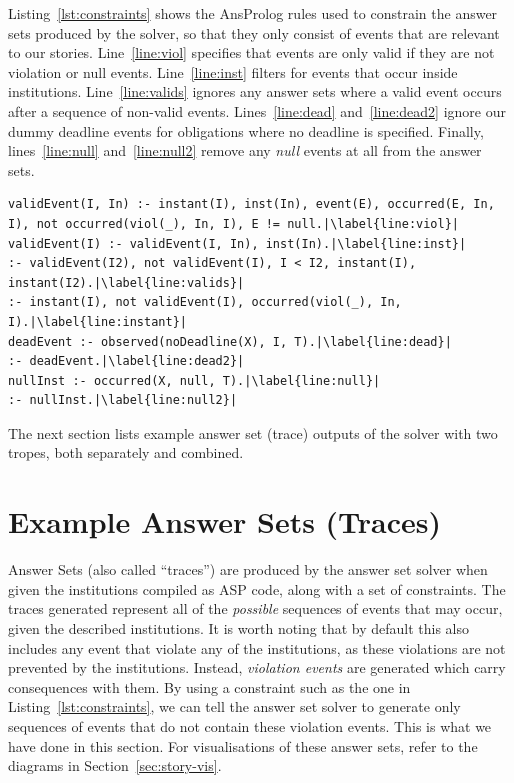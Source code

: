 \documentclass[11pt]{report}
\begin{document}
Listing~\ref{lst:constraints} shows the AnsProlog rules used to constrain the
answer sets produced by the solver, so that they only consist of events that are
relevant to our stories. Line~\ref{line:viol} specifies that events are only
valid if they are not violation or null events. Line~\ref{line:inst} filters
for events that occur inside institutions. Line~\ref{line:valids} ignores
any answer sets where a valid event occurs after a sequence of non-valid events.
Lines~\ref{line:dead} and~\ref{line:dead2} ignore our dummy deadline events for
obligations where no deadline is specified. Finally, lines~\ref{line:null}
and~\ref{line:null2} remove any \emph{null} events at all from the answer sets.

\begin{lstlisting}[label={lst:constraints}, caption={Constraint rules to remove invalid and irrelevant events}, escapechar=|]
validEvent(I, In) :- instant(I), inst(In), event(E), occurred(E, In, I), not occurred(viol(_), In, I), E != null.|\label{line:viol}|
validEvent(I) :- validEvent(I, In), inst(In).|\label{line:inst}|
:- validEvent(I2), not validEvent(I), I < I2, instant(I), instant(I2).|\label{line:valids}|
:- instant(I), not validEvent(I), occurred(viol(_), In, I).|\label{line:instant}|
deadEvent :- observed(noDeadline(X), I, T).|\label{line:dead}|
:- deadEvent.|\label{line:dead2}|
nullInst :- occurred(X, null, T).|\label{line:null}|
:- nullInst.|\label{line:null2}|
\end{lstlisting}

The next section lists example answer set (trace) outputs of the solver with two
tropes, both separately and combined.

\section{Example Answer Sets (Traces)}
\label{sec:example-traces}
Answer Sets (also called ``traces'') are produced by the answer set solver when
given the institutions compiled as ASP code, along with a set of constraints.
The traces generated represent all of the \emph{possible} sequences of events
that may occur, given the described institutions. It is worth noting that by
default this also includes any event that violate any of the institutions, as
these violations are not prevented by the institutions. Instead, \emph{violation
events} are generated which carry consequences with them. By using a constraint
such as the one in Listing~\ref{lst:constraints}, we can tell the answer set
solver to generate only sequences of events that do not contain these violation
events. This is what we have done in this section. For visualisations of these
answer sets, refer to the diagrams in Section~\ref{sec:story-vis}.
\end{document}
